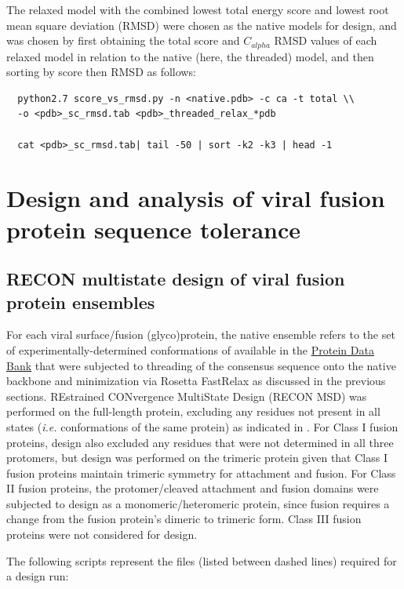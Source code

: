 \documentclass[10pt]{article}
\begin{document}
The relaxed model with the combined lowest total energy score and lowest root mean square deviation (RMSD) were chosen as the native models for design, and was chosen by first obtaining the total score and $C_{alpha}$ RMSD values of each relaxed model in relation to the native (here, the threaded) model, and then sorting by score then RMSD as follows:
\begin{lstlisting}
  python2.7 score_vs_rmsd.py -n <native.pdb> -c ca -t total \\
  -o <pdb>_sc_rmsd.tab <pdb>_threaded_relax_*pdb
  
  cat <pdb>_sc_rmsd.tab| tail -50 | sort -k2 -k3 | head -1
\end{lstlisting}

\section{Design and analysis of viral fusion protein sequence tolerance}
\subsection{RECON multistate design of viral fusion protein ensembles}\label{sec:design}

For each viral surface/fusion (glyco)protein, the native ensemble refers to the set of experimentally-determined conformations of available in the \href{www.rcsb.org}{Protein Data Bank} that were subjected to threading of the consensus sequence onto the native backbone and minimization via Rosetta FastRelax as discussed in the previous sections. REstrained CONvergence MultiState Design (RECON MSD) was performed on the full-length protein, excluding any residues not present in all states (\textit{i.e.} conformations of the same protein) as indicated in . For Class I fusion proteins, design also excluded any residues that were not determined in all three protomers, but design was performed on the trimeric protein given that Class I fusion proteins maintain trimeric symmetry for attachment and fusion. For Class II fusion proteins, the protomer/cleaved attachment and fusion domains were subjected to design as a monomeric/heteromeric protein, since fusion requires a change from the fusion protein's dimeric to trimeric form. Class III fusion proteins were not considered for design.

The following scripts represent the files (listed between dashed lines) required for a design run:
\end{document}
